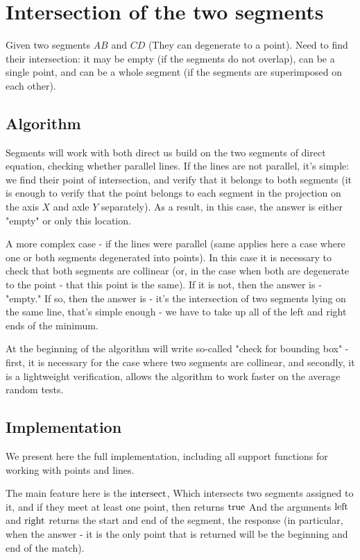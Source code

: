 \section{ Intersection of the two segments }
Given two segments $AB$ and $CD$ (They can degenerate to a point). Need to find their intersection: it may be empty (if the segments do not overlap), can be a single point, and can be a whole segment (if the segments are superimposed on each other).

\subsection{ Algorithm }

Segments will work with both direct us build on the two segments of direct equation, checking whether parallel lines. If the lines are not parallel, it's simple: we find their point of intersection, and verify that it belongs to both segments (it is enough to verify that the point belongs to each segment in the projection on the axis $X$ and axle $Y$ separately). As a result, in this case, the answer is either "empty" or only this location.

A more complex case - if the lines were parallel (same applies here a case where one or both segments degenerated into points). In this case it is necessary to check that both segments are collinear (or, in the case when both are degenerate to the point - that this point is the same). If it is not, then the answer is - "empty." If so, then the answer is - it's the intersection of two segments lying on the same line, that's simple enough - we have to take up all of the left and right ends of the minimum.

At the beginning of the algorithm will write so-called "check for bounding box" - first, it is necessary for the case where two segments are collinear, and secondly, it is a lightweight verification, allows the algorithm to work faster on the average random tests.

\subsection{ Implementation }

We present here the full implementation, including all support functions for working with points and lines.

The main feature here is the $\rm intersect$, Which intersects two segments assigned to it, and if they meet at least one point, then returns $\rm true$ And the arguments $\rm left$ and $\rm right$ returns the start and end of the segment, the response (in particular, when the answer - it is the only point that is returned will be the beginning and end of the match).

